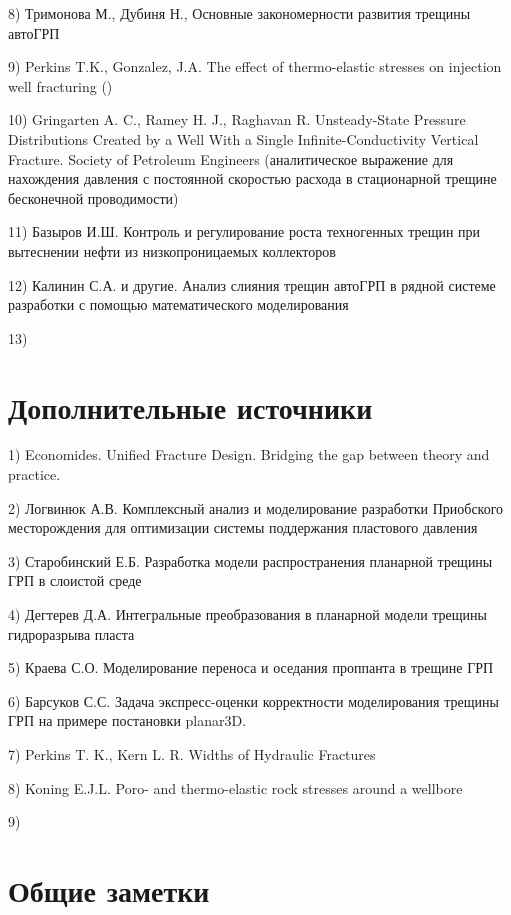 \documentclass[a4paper, 12pt]{article}
\begin{document}
8) Тримонова М., Дубиня Н., Основные закономерности развития трещины автоГРП

9) Perkins T.K., Gonzalez, J.A. The effect of thermo-elastic stresses on injection well fracturing ()

10) Gringarten A. C., Ramey H. J., Raghavan R. Unsteady-State Pressure Distributions Created by a Well With a Single Infinite-Conductivity Vertical Fracture. Society of Petroleum Engineers (аналитическое выражение для нахождения давления с постоянной скоростью расхода в стационарной трещине бесконечной проводимости)

11) Базыров И.Ш. Контроль и регулирование роста техногенных трещин при вытеснении нефти из низкопроницаемых коллекторов

12) Калинин С.А. и другие. Анализ слияния трещин автоГРП в рядной системе разработки с помощью математического моделирования

13) 
\\

\section{Дополнительные источники}

1) Economides. Unified Fracture Design. Bridging the gap between theory and practice.

2) Логвинюк А.В. Комплексный анализ и моделирование разработки Приобского месторождения для оптимизации системы поддержания пластового давления

3) Старобинский Е.Б. Разработка модели распространения планарной трещины ГРП в слоистой среде

4) Дегтерев Д.А. Интегральные преобразования в планарной модели трещины гидроразрыва пласта

5) Краева С.О. Моделирование переноса и оседания проппанта в трещине ГРП

6) Барсуков С.С. Задача экспресс-оценки корректности моделирования трещины ГРП на примере постановки planar3D.

7) Perkins T. K., Kern L. R. Widths of Hydraulic Fractures

8) Koning E.J.L. Poro- and thermo-elastic rock stresses around a wellbore

9) 
\\


\section{Общие заметки}
\end{document}
